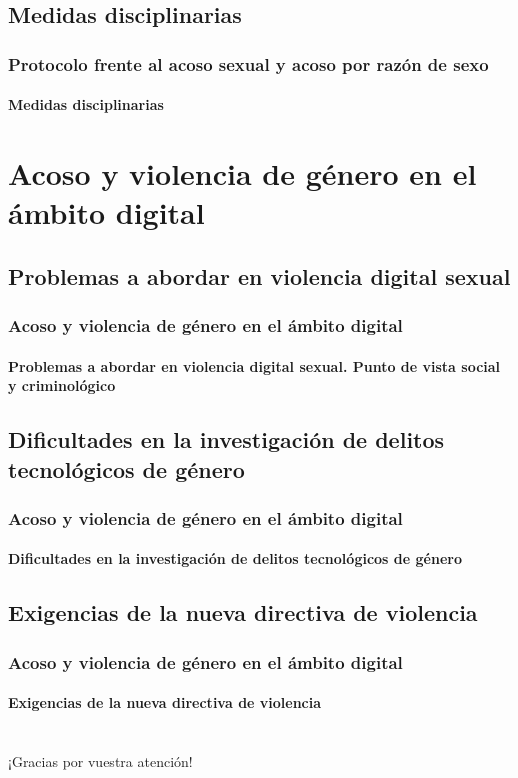 \documentclass{beamer}
\begin{document}
    \subsection{Medidas disciplinarias}
    \begin{frame}
        \frametitle{Protocolo frente al acoso sexual y acoso por razón de sexo}
        \framesubtitle{Medidas disciplinarias}
    \end{frame}


    \section{Acoso y violencia de género en el ámbito digital}

    \subsection{Problemas a abordar en violencia digital sexual}
    \begin{frame}
        \frametitle{Acoso y violencia de género en el ámbito digital}
        \framesubtitle{Problemas a abordar en violencia digital sexual. Punto de vista social y criminológico}
    \end{frame}

    \subsection{Dificultades en la investigación de delitos tecnológicos de género}
    \begin{frame}
        \frametitle{Acoso y violencia de género en el ámbito digital}
        \framesubtitle{Dificultades en la investigación de delitos tecnológicos de género}
    \end{frame}

    \subsection{Exigencias de la nueva directiva de violencia}
    \begin{frame}
        \frametitle{Acoso y violencia de género en el ámbito digital}
        \framesubtitle{Exigencias de la nueva directiva de violencia}
    \end{frame}


    \section{}

    \subsection{}

    \begin{frame}
        \begin{block}{}
            \centering
            ¡Gracias por vuestra atención!
        \end{block}
    \end{frame}
\end{document}
